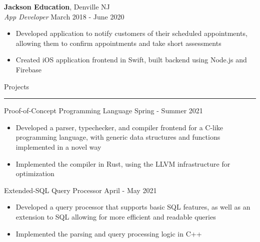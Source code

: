 \documentclass{article}
\newcommand \spacingBetweenHeadings {0.3em}
\newcommand \spacingAfterHeadings {0.5em}
\begin{document}
\noindent
\textbf{Jackson Education}, Denville NJ\\
\textit{App Developer}
\hfill
March 2018 - June 2020\\
\vspace{-1em}
\begin{itemize}
\item Developed application to notify customers of their scheduled appointments, allowing them to \mbox{confirm} appointments and take short assessments
\item Created iOS application frontend in Swift, built backend using Node.js and Firebase
\end{itemize}


\vspace{\spacingBetweenHeadings}

\noindent
\huge Projects\par
\vspace{0.1em}
\hrule
\Large
\vspace{\spacingAfterHeadings}


\iffalse %

\noindent
Compiler for Small Imperative Language
\hfill
Spring 2020\\
\vspace{-1em}
\begin{itemize}
\item Developed a parser, typechecker, frontend, and optimizing backend for an imperative programming language as part of a class on compiler design
\item Implemented the compiler in OCaml using LLVM as a middle-end and x86 as the target architecture
\end{itemize}

\fi

\noindent
Proof-of-Concept Programming Language
\hfill
Spring - Summer 2021\\
\vspace{-1em}
\begin{itemize}
\item Developed a parser, typechecker, and compiler frontend for a C-like programming language, with generic data structures and functions implemented in a novel way
\item Implemented the compiler in Rust, using the LLVM infrastructure for optimization
\end{itemize}


\noindent
Extended-SQL Query Processor
\hfill
April - May 2021\\
\vspace{-1em}
\begin{itemize}
\item Developed a query processor that supports basic SQL features, as well as an extension to SQL allowing for more efficient and readable queries
\item Implemented the parsing and query processing logic in C++
\end{itemize}
\end{document}

